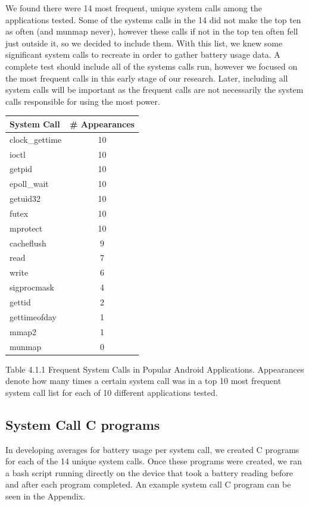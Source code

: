 \documentclass[11pt]{article}
\begin{document}
We found there were 14 most frequent, unique system calls among the applications tested.  Some of the 
systems calls in the 14 did not make the top ten as often (and munmap never), however these calls if 
not in the top ten often fell just outside it, so we decided to include them.  With this list, we knew 
some significant system calls to recreate in order to gather battery usage data.  A complete test 
should include all of the systems calls run, however we focused on the most frequent calls in 
this early stage of our research.  Later, including all system calls will be important as the frequent 
calls are not necessarily the system calls responsible for using the most power. 
\newline
\begin{tabular}{l c}
   System Call & \# Appearances \\
   \hline
   clock\_gettime & 10 \\
   ioctl & 10 \\
   getpid & 10 \\
   epoll\_wait & 10 \\
   getuid32 & 10 \\
   futex & 10 \\
   mprotect & 10 \\
   cacheflush & 9 \\
   read & 7 \\
   write & 6 \\
   sigprocmask & 4 \\
   gettid & 2 \\
   gettimeofday & 1 \\
   mmap2 & 1 \\
   munmap & 0 \\ 
\end{tabular}
\newline
{\fontsize{11}{13}\selectfont Table 4.1.1 Frequent System Calls in Popular Android Applications. Appearances denote how many
times a certain system call was in a top 10 most frequent system call list for each of 10 different applications tested.}
\newline

\subsection{System Call C programs}

In developing averages for battery usage per system call, we created C programs for each of the 14 unique system 
calls.  Once these programs were created, we ran a bash script running directly on the device that took a battery 
reading before and after each program completed.  An example system call C program can be seen in the Appendix.  
\end{document}
